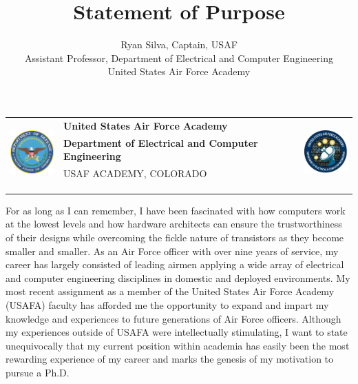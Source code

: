 \documentclass{article}
\begin{document}
\noindent \begin{tabu} to \textwidth{l X[c] r}
 & 
\textbf{United States Air Force Academy} &  
\\
& \textbf{Department of Electrical and Computer Engineering} & \\
& \tiny{USAF ACADEMY, COLORADO}\\
\\ \\ \\
\end{tabu}

\title{Statement of Purpose}
\author{Ryan Silva, Captain, USAF\\Assistant Professor, Department of
Electrical and Computer Engineering\\United States Air Force Academy}
\date{}
{\let\newpage\relax\maketitle}

For as long as I can remember, I have been fascinated with how computers work
at the lowest levels and how hardware architects can ensure the trustworthiness
of their designs while overcoming the
fickle nature of transistors as they become smaller and smaller. 
As an Air Force officer with over nine years of service, my career has largely consisted of
leading airmen applying a wide array of electrical and computer
engineering disciplines in domestic and deployed environments. My most
recent assignment as a member of the United States Air Force 
Academy (USAFA) faculty has afforded me the opportunity to expand and impart my knowledge and
experiences to future generations of Air Force officers. Although my
experiences outside of USAFA were
intellectually stimulating, I want to state
unequivocally that my current position within academia has easily been the most
rewarding experience of my career and marks the genesis of my motivation to pursue
a Ph.D. 
\end{document}
